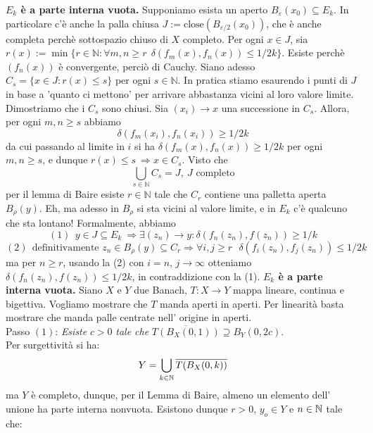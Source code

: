 \textbf{$E_k$ è a parte interna vuota.} 
Supponiamo esista un aperto $B_{\varepsilon}(x_0) \subseteq E_k$. In particolare c'è anche la palla chiusa $ J := \mathrm{close}(B_{\varepsilon/2}(x_0) ) $, che è anche completa perchè sottospazio chiuso di $X$ completo. \newline 
Per ogni $x \in J$, sia $r(x) := \min \{r \in \mathbb{N}: \forall m,n \ge r \ \ \delta(f_m(x), f_n(x) ) \le 1/2k\} $. Esiste perchè $(f_n(x))$ è convergente, perciò di Cauchy. \newline
Siano adesso $C_s = \{x \in J: r(x) \le s\}$ per ogni $s \in \mathbb{N} $. \newline
In pratica stiamo esaurendo i punti di $J$ in base a 'quanto ci mettono' per arrivare abbastanza vicini al loro valore limite. Dimostriamo che i $C_s$ sono chiusi. Sia $(x_i) \rightarrow x $ una successione in $C_s$. Allora, per ogni $m,n \ge s $ abbiamo 
$$ \delta( f_m(x_i), f_n(x_i) ) \ge 1/2k $$
da cui passando al limite in $i$ si ha $\delta( f_m(x), f_n(x) ) \ge 1/2k $ per ogni $m,n \ge s$, e dunque $r(x) \le s \ \Rightarrow x \in C_s$. Visto che
$$\bigcup_{s \in \mathbb{N}} C_s = J, \ J \text{ completo} $$
per il lemma di Baire esiste $r\in \mathbb{N}$ tale che $C_r$ contiene una palletta aperta $B_{\rho}(y)$. Eh, ma adesso in $B_{\rho}$ si sta vicini al valore limite, e in $E_k$ c'è qualcuno che sta lontano! Formalmente, abbiamo
$$ (1) \ \ y \in J \subseteq E_k \ \Rightarrow \exists (z_n) \rightarrow y: \delta( f_n(z_n), f(z_n) ) \ge 1/k  $$
$$ (2) \ \ \text{definitivamente } z_n \in B_{\rho}(y) \subseteq C_r \Rightarrow \forall i,j \ge r  \ \ \ \delta( f_i(z_n), f_j(z_n) ) \le 1/2k $$
ma per $n \ge r$, usando la (2) con $i=n$, $j \to \infty$ otteniamo \newline $\delta( f_n(z_n), f(z_n) ) \le 1/2k$, in contraddizione con la (1).
\newline
\textbf{$E_k$ è a parte interna vuota.} 
 Siano $X$ e $Y$ due Banach, $T:X\rightarrow Y$ mappa lineare, continua e bigettiva. Vogliamo mostrare che $T$ manda aperti in aperti. Per linearità basta mostrare che manda palle centrate nell' origine in aperti.\\
Passo $(1)$: {\it Esiste} $c>0$ {\it tale che} $\overline{T(B_X (0,1))}\supseteq B_Y (0, 2c)$.\\
Per surgettività si ha:
$$
Y=\bigcup_{k\in\mathbb{N}} {\overline{T(B_X (0,k))}}
$$
ma $Y$ è completo, dunque, per il Lemma di Baire, almeno un elemento dell' unione ha parte interna nonvuota. Esistono dunque $r>0$, $y_o\in Y$ e $n\in\mathbb{N}$ tale che:
